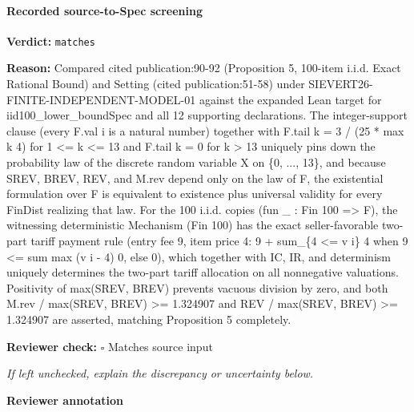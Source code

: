 \documentclass[10pt]{article}
\newcommand{\reviewerbox}{%
  \par\noindent\fbox{\parbox{0.96\linewidth}{\rule{0pt}{0.38in}}}\par
}
\newcommand{\reviewmatch}[1]{%
  \par\noindent\textbf{Reviewer check:} $\square$\; #1\par
  \noindent\emph{If left unchecked, explain the discrepancy or uncertainty below.}\par
}
\begin{document}
\paragraph{Recorded source-to-Spec screening}
\textbf{Verdict:} \texttt{matches}
\\
{\raggedright
\textbf{Reason:} Compared cited publication:\allowbreak{}90-\allowbreak{}92 (Proposition 5, 100-\allowbreak{}item i.\allowbreak{}i.\allowbreak{}d.\allowbreak{} Exact Rational Bound) and Setting (cited publication:\allowbreak{}51-\allowbreak{}58) under SIEVERT26-\allowbreak{}FINITE-\allowbreak{}INDEPENDENT-\allowbreak{}MODEL-\allowbreak{}01 against the expanded Lean target for iid100\_\allowbreak{}lower\_\allowbreak{}boundSpec and all 12 supporting declarations.\allowbreak{} The integer-\allowbreak{}support clause (every F.\allowbreak{}val i is a natural number) together with F.\allowbreak{}tail k = 3 /\allowbreak{} (25 * max k 4) for 1 <= k <= 13 and F.\allowbreak{}tail k = 0 for k > 13 uniquely pins down the probability law of the discrete random variable X on \{0, .\allowbreak{}.\allowbreak{}.\allowbreak{}, 13\}, and because SREV, BREV, REV, and M.\allowbreak{}rev depend only on the law of F, the existential formulation over F is equivalent to existence plus universal validity for every FinDist realizing that law.\allowbreak{} For the 100 i.\allowbreak{}i.\allowbreak{}d.\allowbreak{} copies (fun \_\allowbreak{} :\allowbreak{} Fin 100 => F), the witnessing deterministic Mechanism (Fin 100) has the exact seller-\allowbreak{}favorable two-\allowbreak{}part tariff payment rule (entry fee 9, item price 4:\allowbreak{} 9 + sum\_\allowbreak{}\{4 <= v i\} 4 when 9 <= sum max (v i -\allowbreak{} 4) 0, else 0), which together with IC, IR, and determinism uniquely determines the two-\allowbreak{}part tariff allocation on all nonnegative valuations.\allowbreak{} Positivity of max(SREV, BREV) prevents vacuous division by zero, and both M.\allowbreak{}rev /\allowbreak{} max(SREV, BREV) >= 1.\allowbreak{}324907 and REV /\allowbreak{} max(SREV, BREV) >= 1.\allowbreak{}324907 are asserted, matching Proposition 5 completely.\allowbreak{}
\par}
\reviewmatch{Matches source input}
\noindent\textbf{Reviewer annotation}\par
\reviewerbox
\end{document}
